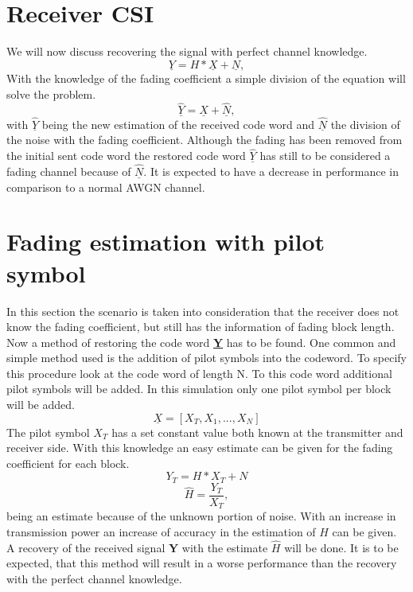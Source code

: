 \section{Receiver CSI}
We will now discuss recovering the signal with perfect channel knowledge. 
\begin{equation}
\underline{Y} = H * \underline{X} + \underline{N},
\end{equation}
With the knowledge of the fading coefficient a simple division of the equation will solve the problem.
\begin{equation}
\underline{\hat{Y}} = \underline{X} + \underline{\hat{N}},
\end{equation}
with $\underline{\hat{Y}}$ being the new estimation of the received code word and $\underline{\hat{N}}$ the division of the noise with the fading coefficient.
Although the fading has been removed from the initial sent code word the restored code word \textbf{$\underline{\hat{Y}}$} has still to be considered a fading channel because of $\underline{\hat{N}}$. It is expected to have a decrease in performance in comparison to a normal AWGN channel.

\section{Fading estimation with pilot symbol}
In this section the scenario is taken into consideration that the receiver does not know the fading coefficient, but still has the information of fading block length. Now a method of restoring the code word \textbf{\underline{Y}} has to be found.
\newline
One common and simple method used is the addition of pilot symbols into the codeword. To specify this procedure look at the code word of length N. To this code word additional pilot symbols will be added. In this simulation only one pilot symbol per block will be added. 
\begin{equation}
\underline{X} = [X_T, X_1, ..., X_N]
\end{equation}
The pilot symbol $X_T$ has a set constant value both known at the transmitter and receiver side. With this knowledge an easy estimate can be given for the fading coefficient for each block.
\begin{equation}
Y_T = H * X_T + N
\end{equation}
\begin{equation}
\hat{H} = \frac{Y_T}{X_T},
\end{equation}
being an estimate because of the unknown portion of noise. With an increase in transmission power an increase of accuracy in the estimation of $H$ can be given.
A recovery of the received signal \textbf{Y} with the estimate \textbf{$\hat{H}$} will be done. It is to be expected, that this method will result in a worse performance than the recovery with the perfect channel knowledge. 

